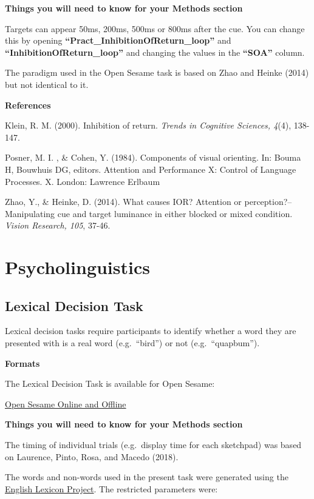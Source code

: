 \documentclass[
]{book}
\begin{document}
\textbf{Things you will need to know for your Methods section}

Targets can appear 50ms, 200ms, 500ms or 800ms after the cue. You can change this by opening \textbf{``Pract\_InhibitionOfReturn\_loop''} and \textbf{``InhibitionOfReturn\_loop''} and changing the values in the \textbf{``SOA''} column.

The paradigm used in the Open Sesame task is based on Zhao and Heinke (2014) but not identical to it.

\textbf{References}

Klein, R. M. (2000). Inhibition of return. \emph{Trends in Cognitive Sciences, 4}(4), 138-147.

Posner, M. I. , \& Cohen, Y. (1984). Components of visual orienting. In: Bouma H, Bouwhuis DG, editors. Attention and Performance X: Control of Language Processes. X. London: Lawrence Erlbaum

Zhao, Y., \& Heinke, D. (2014). What causes IOR? Attention or perception?--Manipulating cue and target luminance in either blocked or mixed condition. \emph{Vision Research, 105}, 37-46.

\hypertarget{psycholinguistics}{%
\chapter{Psycholinguistics}\label{psycholinguistics}}

\hypertarget{lexical-decision-task}{%
\section{Lexical Decision Task}\label{lexical-decision-task}}

Lexical decision tasks require participants to identify whether a word they are presented with is a real word (e.g.~``bird'') or not (e.g.~``quapbum'').

\textbf{Formats}

The Lexical Decision Task is available for Open Sesame:

\href{link\%20here}{Open Sesame Online and Offline}

\textbf{Things you will need to know for your Methods section}

The timing of individual trials (e.g.~display time for each sketchpad) was based on Laurence, Pinto, Rosa, and Macedo (2018).

The words and non-words used in the present task were generated using the \href{https://elexicon.wustl.edu/}{English Lexicon Project}. The restricted parameters were:
\end{document}
